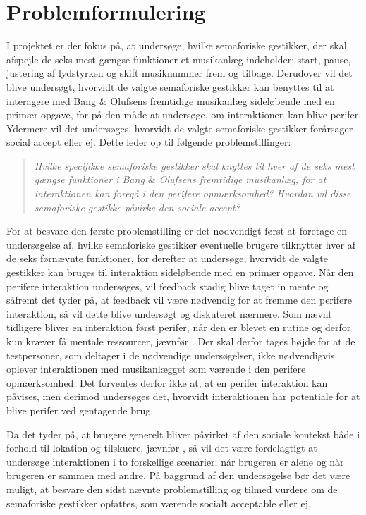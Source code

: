 \section{Problemformulering}
\label{Problemformulering}
%
I projektet er der fokus på, at undersøge, hvilke semaforiske gestikker, der skal afspejle de seks mest gængse funktioner et musikanlæg indeholder; start, pause, justering af lydstyrken og skift musiknummer frem og tilbage. Derudover vil det blive undersøgt, hvorvidt de valgte semaforiske gestikker kan benyttes til at interagere med Bang $\&$ Olufsens fremtidige musikanlæg sideløbende med en primær opgave, for på den måde at undersøge, om interaktionen kan blive perifer. Ydermere vil det undersøges, hvorvidt de valgte semaforiske gestikker forårsager social accept eller ej. Dette leder op til følgende problemstillinger:\blankline
%
\begin{quotation}
	\noindent
	\textit{Hvilke specifikke semaforiske gestikker skal knyttes til hver af de seks mest gængse funktioner i Bang $\&$ Olufsens fremtidige musikanlæg, for at interaktionen kan foregå i den perifere opmærksomhed?\blankline
		Hvordan vil disse semaforiske gestikke påvirke den sociale accept?}\blankline
\end{quotation}
%
For at besvare den første problemstilling er det nødvendigt først at foretage en undersøgelse af, hvilke semaforiske gestikker eventuelle brugere tilknytter hver af de seks førnævnte funktioner, for derefter at undersøge, hvorvidt de valgte gestikker kan bruges til interaktion sideløbende med en primær opgave. Når den perifere interaktion undersøges, vil feedback stadig blive taget in mente og såfremt det tyder på, at feedback vil være nødvendig for at fremme den perifere interaktion, så vil dette blive undersøgt og diskuteret nærmere. Som nævnt tidligere bliver en interaktion først perifer, når den er blevet en rutine og derfor kun kræver få mentale ressourcer, jævnfør . Der skal derfor tages højde for at de testpersoner, som deltager i de nødvendige undersøgelser, ikke nødvendigvis oplever interaktionen med musikanlægget som værende i den perifere opmærksomhed. Det forventes derfor ikke at, at en perifer interaktion kan påvises, men derimod undersøges det, hvorvidt interaktionen har potentiale for at blive perifer ved gentagende brug. 

Da det tyder på, at brugere generelt bliver påvirket af den sociale kontekst både i forhold til lokation og tilskuere, jævnfør , så vil det være fordelagtigt at undersøge interaktionen i to forskellige scenarier; når brugeren er alene og når brugeren er sammen med andre. På baggrund af den undersøgelse bør det være muligt, at besvare den sidst nævnte problemstilling og tilmed vurdere om de semaforiske gestikker opfattes, som værende socialt acceptable eller ej. 




